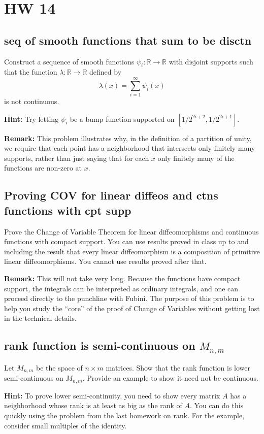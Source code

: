 \documentclass[lang=cn,11pt]{template}
\begin{document}
\chapter{HW 14}

\section{seq of smooth functions that sum to be disctn}
Construct a sequence of smooth functions $\psi_i : \mathbb{R} \to \mathbb{R}$ with disjoint supports such that the function $\lambda : \mathbb{R} \to \mathbb{R}$ defined by
\[
\lambda(x) = \sum_{i=1}^\infty \psi_i(x)
\]
is not continuous.

\textbf{Hint:} Try letting $\psi_i$ be a bump function supported on $[1/2^{2i+2}, 1/2^{2i+1}]$.

\textbf{Remark:} This problem illustrates why, in the definition of a partition of unity, we require that each point has a neighborhood that intersects only finitely many supports, rather than just saying that for each $x$ only finitely many of the functions are non-zero at $x$.

\section{Proving COV for linear diffeos and ctns functions with cpt supp}
Prove the Change of Variable Theorem for linear diffeomorphisms and continuous functions with compact support. You can use results proved in class up to and including the result that every linear diffeomorphism is a composition of primitive linear diffeomorphisms. You cannot use results proved after that.

\textbf{Remark:} This will not take very long. Because the functions have compact support, the integrals can be interpreted as ordinary integrals, and one can proceed directly to the punchline with Fubini. The purpose of this problem is to help you study the “core” of the proof of Change of Variables without getting lost in the technical details.

\section{rank function is semi-continuous on $M_{n,m}$}
Let $M_{n,m}$ be the space of $n \times m$ matrices. Show that the rank function is lower semi-continuous on $M_{n,m}$. Provide an example to show it need not be continuous.

\textbf{Hint:} To prove lower semi-continuity, you need to show every matrix $A$ has a neighborhood whose rank is at least as big as the rank of $A$. You can do this quickly using the problem from the last homework on rank. For the example, consider small multiples of the identity.
\end{document}
